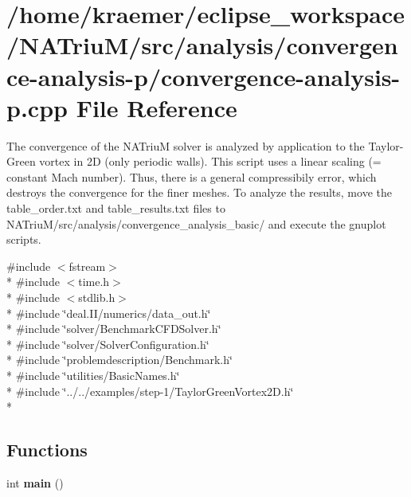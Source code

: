\hypertarget{convergence-analysis-p_8cpp}{\section{/home/kraemer/eclipse\-\_\-workspace/\-N\-A\-Triu\-M/src/analysis/convergence-\/analysis-\/p/convergence-\/analysis-\/p.cpp File Reference}
\label{convergence-analysis-p_8cpp}
}


The convergence of the N\-A\-Triu\-M solver is analyzed by application to the Taylor-\/\-Green vortex in 2\-D (only periodic walls). This script uses a linear scaling (= constant Mach number). Thus, there is a general compressibily error, which destroys the convergence for the finer meshes. To analyze the results, move the table\-\_\-order.\-txt and table\-\_\-results.\-txt files to N\-A\-Triu\-M/src/analysis/convergence\-\_\-analysis\-\_\-basic/ and execute the gnuplot scripts.  


{\ttfamily \#include $<$fstream$>$}\\*
{\ttfamily \#include $<$time.\-h$>$}\\*
{\ttfamily \#include $<$stdlib.\-h$>$}\\*
{\ttfamily \#include \char`\"{}deal.\-I\-I/numerics/data\-\_\-out.\-h\char`\"{}}\\*
{\ttfamily \#include \char`\"{}solver/\-Benchmark\-C\-F\-D\-Solver.\-h\char`\"{}}\\*
{\ttfamily \#include \char`\"{}solver/\-Solver\-Configuration.\-h\char`\"{}}\\*
{\ttfamily \#include \char`\"{}problemdescription/\-Benchmark.\-h\char`\"{}}\\*
{\ttfamily \#include \char`\"{}utilities/\-Basic\-Names.\-h\char`\"{}}\\*
{\ttfamily \#include \char`\"{}../../examples/step-\/1/\-Taylor\-Green\-Vortex2\-D.\-h\char`\"{}}\\*
\subsection*{Functions}
\begin{DoxyCompactItemize}
\item 
\hypertarget{convergence-analysis-p_8cpp_ae66f6b31b5ad750f1fe042a706a4e3d4}{int {\bfseries main} ()}\label{convergence-analysis-p_8cpp_ae66f6b31b5ad750f1fe042a706a4e3d4}

\end{DoxyCompactItemize}


